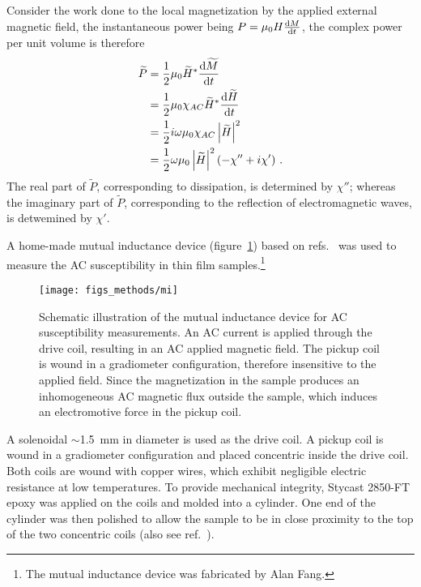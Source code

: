Consider the work done to the local magnetization by the applied external magnetic field, the instantaneous power being $P = \mu_0H\frac{\mathop{}\!\mathrm{d} M}{\mathop{}\!\mathrm{d} t}$, the complex power per unit volume is therefore%
\begin{align}%
    \widetilde{P} &= \frac{1}{2}\mu_0 \widetilde{H}^* \frac{\diff \widetilde{M}}{\diff t}\nonumber\\
        &= \frac{1}{2}\mu_0\chi_{AC}\widetilde{H}^*\frac{\diff \widetilde{H}}{\diff t}\nonumber\\
        &= \frac{1}{2}i\omega\mu_0\chi_{AC}\left|\widetilde{H}\right|^2\nonumber\\
        &= \frac{1}{2}\omega\mu_0\left|\widetilde{H}\right|^2(-\chi''+i\chi')\label{eq:acm_power}~.
\end{align}%
The real part of $\widetilde{P}$, corresponding to dissipation, is determined by $\chi''$; whereas the imaginary part of $\widetilde{P}$, corresponding to the reflection of electromagnetic waves, is detwemined by $\chi'$.

A home-made mutual inductance device (figure~\ref{fig:mi_sketch}) based on refs.~\cite{Jeanneret1989} was used to measure the AC susceptibility in thin film samples.\footnote{The mutual inductance device was fabricated by Alan Fang.} %
\begin{figure}[ht]%
	\centering%
    \texttt{[image: figs\_methods/mi]}%
    \caption[Mutual inductance device for AC susceptibility measurements]{\label{fig:mi_sketch}Schematic illustration of the mutual inductance device for AC susceptibility measurements. An AC current is applied through the drive coil, resulting in an AC applied magnetic field. The pickup coil is wound in a gradiometer configuration, therefore insensitive to the applied field. Since the magnetization in the sample produces an inhomogeneous AC magnetic flux outside the sample, which induces an electromotive force in the pickup coil.}%
\end{figure}%
%
A solenoidal $\sim$\SI{1.5}{mm} in diameter is used as the drive coil. A pickup coil is wound in a gradiometer configuration and placed concentric inside the drive coil. Both coils are wound with copper wires, which exhibit negligible electric resistance at low temperatures. To provide mechanical integrity, Stycast 2850-FT epoxy was applied on the coils and molded into a cylinder. One end of the cylinder was then polished to allow the sample to be in close proximity to the top of the two concentric coils (also see ref.~\cite{YazdaniThesis}).

